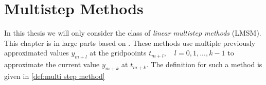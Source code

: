 	
		
	
	
		
	
			
\section{Multistep Methods}
	\label{sec:multistep methods}
	
	In this thesis we will only consider the class of \emph{linear multistep methods} (LMSM). This chapter is in large parts based on \cite{NumerikGewöhnlicherDifferentialgleichungen}. These methods use multiple previously approximated values $y_{m+l}$ at the gridpooints  $t_{m+l}, \quad l=0,1,...,k-1$ to approximate the current value $y_{m+k}$ at $t_{m+k}$. The definition for such a method is given in \ref{def:multi step method}
	
